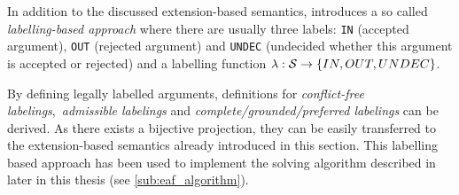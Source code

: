 In addition to the discussed extension-based semantics, \cite{liao} introduces a so called \textit{labelling-based approach} where there are usually three labels: \texttt{IN} (accepted argument), \texttt{OUT} (rejected argument) and \texttt{UNDEC} (undecided whether this argument is accepted or rejected) and a labelling function $\lambda: \S \rightarrow \{IN, OUT, UNDEC\}$.

By defining legally labelled arguments, definitions for \textit{conflict-free labelings},~\textit{admissible labelings} and \textit{complete/grounded/preferred labelings} can be derived. As there exists a bijective projection, they can be easily transferred to the extension-based semantics already introduced in this section. This labelling based approach has been used to implement the solving algorithm described in \cite{Modgil2009Labellings} later in this thesis (see \autoref{sub:eaf_algorithm}).

